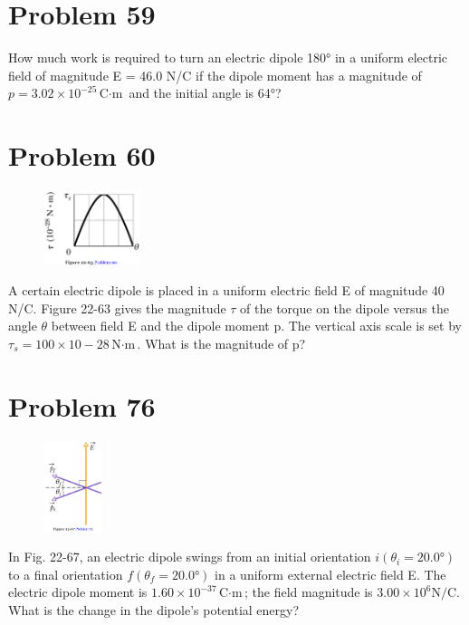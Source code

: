 \documentclass[12pt]{article}
\begin{document}
\section{Problem 59}
How much work is required to turn an electric dipole 180\unit{\degree} in a uniform electric field of magnitude E = 46.0 N/C if the dipole moment has a magnitude of $p = 3.02 \times 10^{-25} \unit{\coulomb\cdot\meter}$ and the initial angle is 64\unit{\degree}?

\section{Problem 60}
\begin{figure}
    \vspace{-30pt}
    \includegraphics[width=0.25\textwidth]{picture_5.png} 
\end{figure}
A certain electric dipole is placed in a uniform electric field E of magnitude 40 N/C. Figure 22-63 gives the magnitude $\tau$ of the torque on the dipole versus the angle $\theta$ between field E and the dipole moment p. The vertical axis scale is set by $\tau_s = 100 \times 10-28 \unit{\newton\cdot\meter}$. What is the magnitude of p?

\section{Problem 76}
\begin{figure}
    \vspace{-30pt}
    \includegraphics[width=0.15\textwidth]{picture_6.png} 
\end{figure}
In Fig. 22-67, an electric dipole swings from an initial orientation $i (\theta_i = 20.0\unit{\degree})$ to a final orientation $f (\theta_f= 20.0\unit{\degree})$ in a uniform external electric field E. The electric dipole moment is $1.60 \times 10^{-37} \unit{\coulomb\cdot\meter}$; the field magnitude is $3.00 \times 10^6 \unit{\newton/\coulomb}$. What is the change in the dipole's potential energy?
\end{document}

